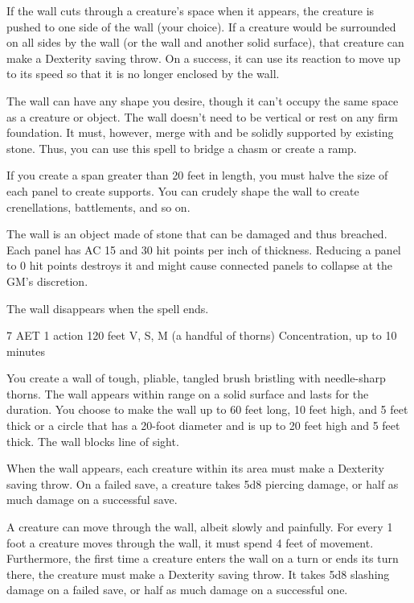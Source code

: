 If the wall cuts through a creature's space when it appears, the creature is pushed to one side of the wall (your choice). If a creature would be surrounded on all sides by the wall (or the wall and another solid surface), that creature can make a Dexterity saving throw. On a success, it can use its reaction to move up to its speed so that it is no longer enclosed by the wall.

The wall can have any shape you desire, though it can't occupy the same space as a creature or object. The wall doesn't need to be vertical or rest on any firm foundation. It must, however, merge with and be solidly supported by existing stone. Thus, you can use this spell to bridge a chasm or create a ramp.

If you create a span greater than 20 feet in length, you must halve the size of each panel to create supports. You can crudely shape the wall to create crenellations, battlements, and so on.

The wall is an object made of stone that can be damaged and thus breached. Each panel has AC 15 and 30 hit points per inch of thickness. Reducing a panel to 0 hit points destroys it and might cause connected panels to collapse at the GM's discretion.

The wall disappears when the spell ends.

\label{spell:wall-of-thorns}
{7 AET}
{1 action}
{120 feet}
{V, S, M (a handful of thorns)}
{Concentration, up to 10 minutes}

You create a wall of tough, pliable, tangled brush bristling with needle-sharp thorns. The wall appears within range on a solid surface and lasts for the duration. You choose to make the wall up to 60 feet long, 10 feet high, and 5 feet thick or a circle that has a 20-foot diameter and is up to 20 feet high and 5 feet thick. The wall blocks line of sight.

When the wall appears, each creature within its area must make a Dexterity saving throw. On a failed save, a creature takes 5d8 piercing damage, or half as much damage on a successful save.

A creature can move through the wall, albeit slowly and painfully. For every 1 foot a creature moves through the wall, it must spend 4 feet of movement. Furthermore, the first time a creature enters the wall on a turn or ends its turn there, the creature must make a Dexterity saving throw. It takes 5d8 slashing damage on a failed save, or half as much damage on a successful one.

